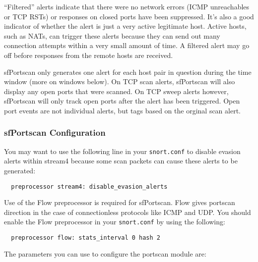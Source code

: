 \documentclass[english]{report}
\begin{document}
``Filtered'' alerts indicate that there were no network errors (ICMP
unreachables or TCP RSTs) or responses on closed ports have been
suppressed. It's also a good indicator of whether the alert is just a
very active legitimate host. Active hosts, such as NATs, can trigger
these alerts because they can send out many connection attempts within
a very small amount of time. A filtered alert may go off before
responses from the remote hosts are received.

sfPortscan only generates one alert for each host pair in question during
the time window (more on windows below). On TCP scan alerts, sfPortscan
will also display any open ports that were scanned. On TCP sweep alerts
however, sfPortscan will only track open ports after the alert has been
triggered. Open port events are not individual alerts, but tags based
on the orginal scan alert.

\subsubsection{sfPortscan Configuration\label{sfportscan configuration}}

You may want to use the following line in your \texttt{snort.conf} to disable evasion alerts 
within stream4 because some
scan packets can cause these alerts to be generated:

\begin{verbatim}
  preprocessor stream4: disable_evasion_alerts
\end{verbatim}

Use of the Flow preprocessor is required for sfPortscan. Flow gives
portscan direction in the case of connectionless protocols like ICMP
and UDP. You should enable the Flow preprocessor in your \texttt{snort.conf} by 
using the following:

\begin{verbatim}
  preprocessor flow: stats_interval 0 hash 2
\end{verbatim}

The parameters you can use to configure the portscan module are:
\end{document}
